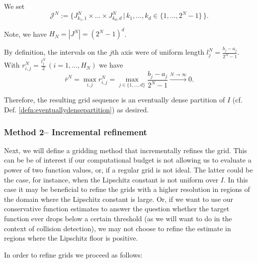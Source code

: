 We set \[ \mathcal J^N := \bigl\{ J_{k_1,1}^N\times \ldots \times J_{k_d,d}^N \, \vert \, k_1,...,k_d \in \{1,...,2^N-1 \}\,   \bigr\}.\]

Note, we have $H_N = |J^N| = (2^N-1)^d$.

By definition, the intervals on the $j$th axis were of uniform length $l_{j}^N=\frac{b_j-a_j}{2^N-1}$.
With $r_{i,j}^N = \frac{l_j^N}{2} \, (i=1,...,H_N)$ we have   \[\bar r^N = \max_{i,j} r_{i,j}^N =  \max_{j \in \{1,...,d\}} \frac{b_j-a_j}{2^N-1} \stackrel{N \to \infty}{\longrightarrow} 0.\]

Therefore, the resulting grid sequence is an eventually dense partition of $I$ (cf. Def. \ref{defn:eventuallydensepartition}) as desired.  

\subsubsection{Method 2-- Incremental refinement}
Next, we will define a gridding method that incrementally refines the grid. 
This can be be of interest if our computational budget is not allowing us to evaluate a power of two function values, or, 
if a regular grid is not ideal. The latter could be the case, for instance, when the Lipschitz constant is not uniform over $I$. In this case it may be beneficial to refine the grids with a higher resolution in regions of the domain where the Lipschitz constant is large. Or, if we want to use our conservative function estimates to answer the question whether the target function ever drops below a certain threshold (as we will want to do in the context of collision detection), we may not choose to refine the estimate in regions where the Lipschitz floor is positive. 

In order to refine grids we proceed as follows:



